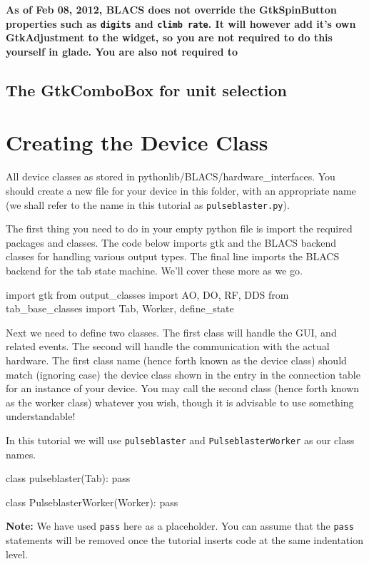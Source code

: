 \documentclass[12pt]{article}
\begin{document}
\textbf{As of Feb 08, 2012, BLACS does not override the GtkSpinButton properties such as \texttt{digits} and \texttt{climb rate}. It will however add it's own GtkAdjustment to the widget, so you are not required to do this yourself in glade. You are also not required to}

\subsection{The GtkComboBox for unit selection}\label{glade unit selection}

\section{Creating the Device Class}\label{creating class}
All device classes as stored in pythonlib/BLACS/hardware\_interfaces. You should create a new file for your device in this folder, with an appropriate name (we shall refer to the name in this tutorial as \texttt{pulseblaster.py}).

The first thing you need to do in your empty python file is import the required packages and classes. The code below imports gtk and the BLACS backend classes for handling various output types. 
The final line imports the BLACS backend for the tab state machine. We'll cover these more as we go.
\begin{python}
import gtk
from output_classes import AO, DO, RF, DDS
from tab_base_classes import Tab, Worker, define_state
\end{python}

Next we need to define two classes. The first class will handle the GUI, and related events. The second will handle the communication with the actual hardware. The first class name (hence forth known as the device class) should match (ignoring case) the device class shown in the entry in the connection table for an instance of your device. You may call the second class (hence forth known as the worker class) whatever you wish, though it is advisable to use something understandable!

In this tutorial we will use \texttt{pulseblaster} and \texttt{PulseblasterWorker} as our class names.

\begin{python}
class pulseblaster(Tab):
    pass
	
class PulseblasterWorker(Worker):
    pass
\end{python}

\textbf{Note:} We have used \texttt{pass} here as a placeholder. You can assume that the \texttt{pass} statements will be removed once the tutorial inserts code at the same indentation level.
\end{document}
